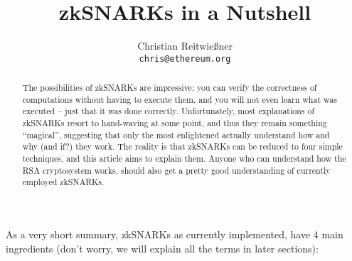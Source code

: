 \documentclass[11pt,letterpaper]{article}
\date{}
\begin{document}


\title{zkSNARKs in a Nutshell}

\author{Christian Reitwießner \\ 
{\tt chris@ethereum.org}}


\maketitle


\begin{abstract}
\noindent The possibilities of zkSNARKs are impressive; you can verify the correctness of computations without having to execute them, and you will not even learn what was executed – just that it was done correctly. Unfortunately, most explanations of zkSNARKs resort to hand-waving at some point, and thus they remain something ``magical'', suggesting that only the most enlightened actually understand how and why (and if?) they work. The reality is that zkSNARKs can be reduced to four simple techniques, and this article aims to explain them. Anyone who can understand how the RSA cryptosystem works, should also get a pretty good understanding of currently employed zkSNARKs.
\end{abstract}


As a very short summary, zkSNARKs as currently implemented, have 4 main ingredients (don’t worry, we will explain all the terms in later sections):
\end{document}
